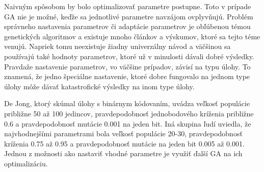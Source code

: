 Naivným spôsobom by bolo optimalizovať parametre postupne. Toto v prípade GA nie je možné, keďže sa jednotlivé parametre navzájom ovplyvňujú. Problém správneho nastavenia parametrov či adaptácie parametrov je obľúbenou témou genetických algoritmov a existuje mnoho článkov a výskumov, ktoré sa tejto téme venujú. Napriek tomu neexistuje žiadny univerzálny návod a väčšinou sa používajú také hodnoty parametrov, ktoré už v minulosti dávali dobré výsledky. Pravdaže nastavenie parametrov, vo väčšine prípadov, závisí na typu úlohy. To znamená, že jedno špeciálne nastavenie, ktoré dobre fungovalo na jednom type úlohy môže dávať katastrofické výsledky na inom type úlohy.

De Jong, ktorý skúmal úlohy s binárnym kódovaním, uvádza veľkosť populácie približne 50 až 100 jedincov, pravdepodobnosť jednobodového kríženia približne 0.6 a pravdepodobnosť mutácie 0.001 na jeden bit. Iná skupina ľudí uviedla, že najvhodnejšími parametrami bola veľkosť populácie 20-30, pravdepodobnosť kríženia 0.75 až 0.95 a pravdepodobnosť mutácie na jeden bit 0.005 až 0.001. Jednou z možnosti ako nastaviť vhodné parametre je využiť ďalší GA na ich optimalizáciu.
